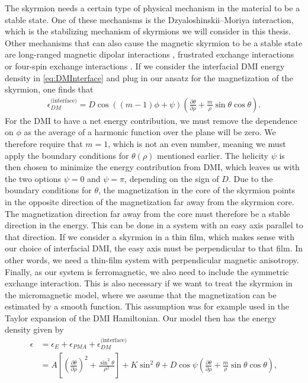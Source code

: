 \documentclass[12pt, a4paper, twoside, openright]{report}
\numberwithin{equation}{chapter}
\numberwithin{figure}{chapter}
\numberwithin{table}{chapter}
\begin{document}
The skyrmion needs a certain type of physical mechanism in the material to be a stable state. One of these mechanisms is the Dzyaloshinskii--Moriya interaction, which is the stabilizing mechanism of skyrmions we will consider in this thesis. Other mechanisms that can also cause the magnetic skyrmion to be a stable state are long-ranged magnetic dipolar interactions \cite{Lin1973}, frustrated exchange interactions \cite{Okubo2012} or four-spin exchange interactions \cite{Heinze2011}. If we consider the interfacial DMI energy density in \eqref{eq:DMInterface} and plug in our ansatz for the magnetization of the skyrmion, one finds that
\begin{align}
\epsilon_{DM}^{\textrm{(interface)}} = D\cos((m-1)\phi + \psi)\left(\frac{\partial\theta}{\partial\rho} + \frac{m}{\rho}\sin\theta\cos\theta\right).
\end{align}
For the DMI to have a net energy contribution, we must remove the dependence on $\phi$ as the average of a harmonic function over the plane will be zero. We therefore require that $m = 1$, which is not an even number, meaning we must apply the boundary conditions for $\theta(\rho)$ mentioned earlier. The helicity $\psi$ is then chosen to minimize the energy contribution from DMI, which leaves us with the two options $\psi = 0$ and $\psi = \pi$, depending on the sign of $D$. Due to the boundary conditions for $\theta$, the magnetization in the core of the skyrmion points in the opposite direction of the magnetization far away from the skyrmion core. The magnetization direction far away from the core must therefore be a stable direction in the energy. This can be done in a system with an easy axis parallel to that direction. If we consider a skyrmion in a thin film, which makes sense with our choice of interfacial DMI, the easy axis must be perpendicular to that film. In other words, we need a thin-film system with perpendicular magnetic anisotropy. Finally, as our system is ferromagnetic, we also need to include the symmetric exchange interaction. This is also necessary if we want to treat the skyrmion in the micromagnetic model, where we assume that the magnetization can be estimated by a smooth function. This assumption was for example used in the Taylor expansion of the DMI Hamiltonian. Our model then has the energy density given by
\begin{align}
\nonumber \epsilon &= \epsilon_E + \epsilon_{PMA} + \epsilon_{DM}^{\textrm{(interface)}} \\
&=A \left[\left(\frac{\partial\theta}{\partial\rho}\right)^2 + \frac{\sin^2\theta}{\rho^2}\right] + K\sin^2\theta + D\cos\psi\left(\frac{\partial\theta}{\partial\rho} + \frac{m}{\rho}\sin\theta\cos\theta\right),
\end{align}
\end{document}
